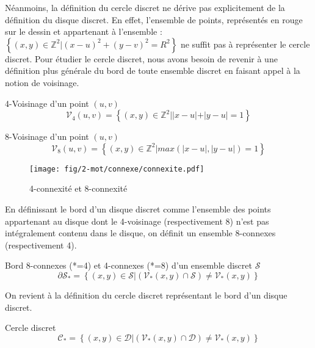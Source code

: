 Néanmoins, la définition du cercle discret ne dérive pas explicitement de la définition du disque discret. En effet, l'ensemble de points, représentés en rouge sur le dessin et appartenant à l'ensemble : $\left\{ (x,y) \in \mathbb{Z}^{2} |  (x - u)^2 + (y - v)^2 = R^2 \right\}$ ne suffit pas à représenter le cercle discret. Pour étudier le cercle discret, nous avons besoin de revenir à une définition plus générale du bord de toute ensemble discret en faisant appel à la notion de voisinage.\\

\begin{Definition}{4-Voisinage d'un point $(u,v)$}
\label{def:vois-4}
  $$\mathcal{V}_4(u,v) =  \left\{ (x,y) \in \mathbb{Z}^{2} |  |x-u|+|y-u| = 1 \right\}$$
\end{Definition}

\begin{Definition}{8-Voisinage d'un point $(u,v)$}
\label{def:vois-8}
  $$\mathcal{V}_8(u,v) =  \left\{ (x,y) \in \mathbb{Z}^{2} |  max(|x-u|,|y-u|) = 1 \right\}$$
\end{Definition}

\begin{figure}[H]
  \centering
  \texttt{[image: fig/2-mot/connexe/connexite.pdf]}
  \caption{4-connexité et 8-connexité}
\end{figure}

En définissant le bord d'un disque discret comme l'ensemble des points appartenant au disque dont le 4-voisinage (respectivement 8) n'est pas intégralement contenu dans le disque, on définit un ensemble 8-connexes (respectivement 4).

\begin{Definition}{Bord 8-connexes (*=4) et 4-connexes (*=8) d'un ensemble discret $\mathcal{S}$}
\label{def:bord-ens}
  $$ \partial \mathcal{S}_{*} =  \left\{ (x,y) \in \mathcal{S} | \left( \mathcal{V}_{*}(x,y) \cap \mathcal{S} \right) \neq \mathcal{V}_{*}(x,y) \right\}$$
\end{Definition}

On revient à la définition du cercle discret représentant le bord d'un disque discret.

\begin{Definition}{Cercle discret}
\label{def:cer-dis}
  $$ \mathcal{C}_{*} =  \left\{ (x,y) \in \mathcal{D} | \left( \mathcal{V}_{*}(x,y) \cap \mathcal{D} \right) \neq \mathcal{V}_{*}(x,y) \right\}$$
\end{Definition}

